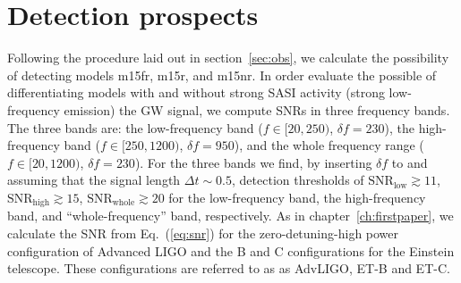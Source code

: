 \section{Detection prospects}
Following the procedure laid out in section~\ref{sec:obs}, we calculate the possibility of detecting models m15fr, m15r, and m15nr.
In order evaluate the possible of differentiating models with and without strong SASI activity (strong low-frequency emission)
the GW signal, we compute SNRs in three frequency bands.
The three bands are: the low-frequency band ($f \in [20,250)$, $\delta f= 230$), the
high-frequency band ($f \in [250,1200)$, $\delta f= 950$), and the whole frequency range
($f \in [20,1200)$,  $\delta f= 230$).
For the three bands we find, by inserting $\delta f$ to  and assuming that the
signal length $\Delta t \sim 0.5$, detection thresholds of $\mathrm{SNR}_\mathrm{low} \gtrsim 11$, 
$\mathrm{SNR}_\mathrm{high} \gtrsim 15$, $\mathrm{SNR}_\mathrm{whole} \gtrsim 20$ for the
low-frequency band, the high-frequency band, and ``whole-frequency'' band, respectively.
As in chapter~\ref{ch:firstpaper}, we calculate the SNR from Eq.~(\ref{eq:snr}) for the zero-detuning-high power configuration
of Advanced LIGO \citep{adv_sens} and the B \citep{et_b} and C \citep{et_c} configurations for the Einstein
telescope. These configurations are referred to as as AdvLIGO, ET-B and ET-C.
